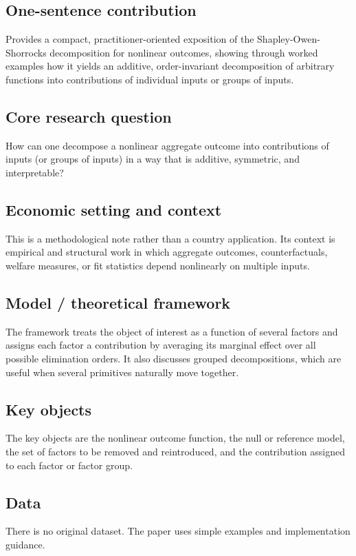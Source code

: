 \documentclass[11pt,a4paper]{article}
\begin{document}
\subsection*{One-sentence contribution}
Provides a compact, practitioner-oriented exposition of the Shapley-Owen-Shorrocks decomposition for nonlinear outcomes, showing through worked examples how it yields an additive, order-invariant decomposition of arbitrary functions into contributions of individual inputs or groups of inputs.

\subsection*{Core research question}
How can one decompose a nonlinear aggregate outcome into contributions of inputs (or groups of inputs) in a way that is additive, symmetric, and interpretable?

\subsection*{Economic setting and context}
This is a methodological note rather than a country application. Its context is empirical and structural work in which aggregate outcomes, counterfactuals, welfare measures, or fit statistics depend nonlinearly on multiple inputs.

\subsection*{Model / theoretical framework}
The framework treats the object of interest as a function of several factors and assigns each factor a contribution by averaging its marginal effect over all possible elimination orders. It also discusses grouped decompositions, which are useful when several primitives naturally move together.

\subsection*{Key objects}
The key objects are the nonlinear outcome function, the null or reference model, the set of factors to be removed and reintroduced, and the contribution assigned to each factor or factor group.

\subsection*{Data}
There is no original dataset. The paper uses simple examples and implementation guidance.
\end{document}
